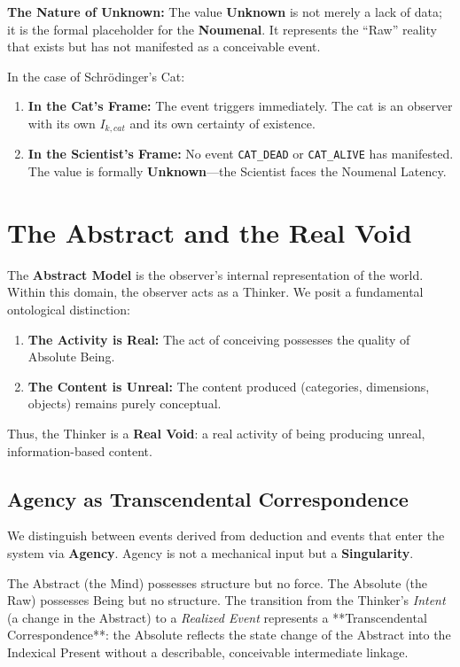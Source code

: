 \documentclass[12pt, a4paper]{article}
\begin{document}
\textbf{The Nature of Unknown:} The value \textbf{Unknown} is not merely a lack of data; it is the formal placeholder for the \textbf{Noumenal}. It represents the ``Raw'' reality that exists but has not manifested as a conceivable event.

In the case of Schrödinger’s Cat:
\begin{enumerate}
    \item \textbf{In the Cat's Frame:} The event triggers immediately. The cat is an observer with its own $I_{k, cat}$ and its own certainty of existence.
    \item \textbf{In the Scientist's Frame:} No event \texttt{CAT\_DEAD} or \texttt{CAT\_ALIVE} has manifested. The value is formally \textbf{Unknown}—the Scientist faces the Noumenal Latency.
\end{enumerate}

\section{The Abstract and the Real Void}

The \textbf{Abstract Model} is the observer’s internal representation of the world. Within this domain, the observer acts as a Thinker. We posit a fundamental ontological distinction:

\begin{enumerate}
    \item \textbf{The Activity is Real:} The act of conceiving possesses the quality of Absolute Being.
    \item \textbf{The Content is Unreal:} The content produced (categories, dimensions, objects) remains purely conceptual.
\end{enumerate}

Thus, the Thinker is a \textbf{Real Void}: a real activity of being producing unreal, information-based content.

\subsection{Agency as Transcendental Correspondence}
We distinguish between events derived from deduction and events that enter the system via \textbf{Agency}. Agency is not a mechanical input but a \textbf{Singularity}.

The Abstract (the Mind) possesses structure but no force. The Absolute (the Raw) possesses Being but no structure. The transition from the Thinker's \textit{Intent} (a change in the Abstract) to a \textit{Realized Event} represents a **Transcendental Correspondence**: the Absolute reflects the state change of the Abstract into the Indexical Present without a describable, conceivable intermediate linkage.
\end{document}
